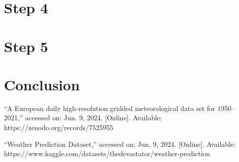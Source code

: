 \documentclass[conference]{IEEEtran}
\begin{document}
\section{Step 4}
\begin{table}[htp]
    \centering
    \caption{Performance Metrics for PCA, ICA, and RP}
    \label{tab:performance_metrics}
    \resizebox{\columnwidth}{!}{%
    \begin{tabular}{lcccc}
    \toprule
    \textbf{Method} & \textbf{Accuracy} & \textbf{Training Time (s)} & \textbf{Prediction Time (s)} & \textbf{F1-Score Avg} \\
    \midrule
    \textbf{PCA} & 0.9334 & 3.4113 & 0.00041 & 0.93 \\
    \textbf{ICA} & 0.9471 & 2.6668 & 0.00051 & 0.95 \\
    \textbf{RP}  & 0.9181 & 2.1919 & 0.00032 & 0.92 \\
    \bottomrule
    \end{tabular}%
    }
\end{table}


\section{Step 5}

\begin{table}[htp]
    \centering
        \caption{Performance comparison of PCA, ICA, and RP with clusters.}
    \label{tab:performance_comparison}
      \resizebox{\columnwidth}{!}{%
    \begin{tabular}{lcccc}
        \toprule
         \textbf{Method} & \textbf{Accuracy} & \textbf{Training Time (s)} & \textbf{Prediction Time (s)} & \textbf{F1-Score Avg} \\
        \midrule
        \textbf{PCA w/ Clusters} & 0.9454 & 3.6799 & 0.00038 & 0.95\\
        \textbf{ICA w/ Clusters} & 0.9369 & 3.55548 & 0.00029 & 0.94\\
        \textbf{RP w/ Clusters} & 0.9300 & 2.15453 & 0.00033 & 0.93\\
        \bottomrule
        
    \end{tabular}%
    }

\end{table}

\section{Conclusion}



\begin{thebibliography}{1}

``A European daily high-resolution gridded meteorological data set for 1950–2021,'' accessed on: Jun. 9, 2024. [Online]. Available: https://zenodo.org/records/7525955

``Weather Prediction Dataset,'' accessed on: Jun. 9, 2024. [Online]. Available: https://www.kaggle.com/datasets/thedevastator/weather-prediction

\end{thebibliography}
\end{document}
